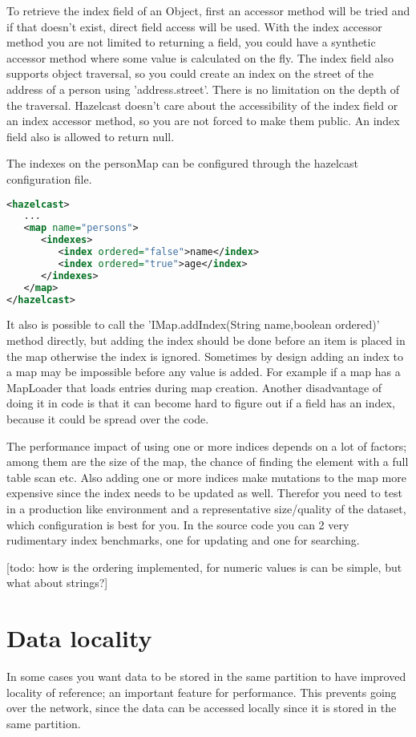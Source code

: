 To retrieve the index field of an Object, first an accessor method will be tried and if that doesn't exist, direct field access will be used. With the index accessor method you are not limited to returning a field, you could have a synthetic accessor method where some value is calculated on the fly. The index field also supports object traversal, so you could create an index on the street of the address of a person using 'address.street'. There is no limitation on the depth of the traversal. Hazelcast doesn't care about the accessibility of the index field or an index accessor method, so you are not forced to make them public. An index field also is allowed to return null.

The indexes on the personMap can be configured through the hazelcast configuration file. 
\begin{lstlisting}[language=xml]
<hazelcast>
   ...
   <map name="persons">
      <indexes>
         <index ordered="false">name</index>
         <index ordered="true">age</index>
      </indexes>
   </map>
</hazelcast>
\end{lstlisting}
It also is possible to call the 'IMap.addIndex(String name,boolean ordered)' method directly, but adding the index should be done before an item is placed in the map otherwise the index is ignored. Sometimes by design adding an index to a map may be impossible before any value is added. For example if a map has a MapLoader that loads entries during map creation. Another disadvantage of doing it in code is that it can become hard to figure out if a field has an index, because it could be spread over the code.

The performance impact of using one or more indices depends on a lot of factors; among them are the size of the map, the chance of finding the element with a full table scan etc. Also adding one or more indices make mutations to the map more expensive since the index needs to be updated as well. Therefor you need to test in a production like environment and a representative size/quality of the dataset, which configuration is best for you. In the source code you can 2 very rudimentary index benchmarks, one for updating and one for searching. 

[todo: how is the ordering implemented, for numeric values is can be simple, but what about strings?]

\section{Data locality}
In some cases you want data to be stored in the same partition to have improved locality of reference; an important feature for performance. This prevents going over the network, since the data can be accessed locally since it is stored in the same partition.

